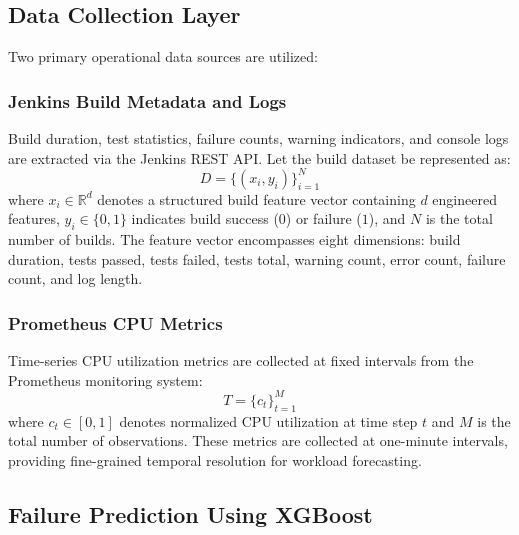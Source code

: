 \documentclass[sn-nature]{sn-jnl}
\theoremstyle{thmstyleone}
\theoremstyle{thmstyletwo}
\theoremstyle{thmstylethree}
\begin{document}
\subsection{Data Collection Layer}\label{subsec:datacollection}

Two primary operational data sources are utilized:

\subsubsection{Jenkins Build Metadata and Logs}
Build duration, test statistics, failure counts, warning indicators, and console logs are extracted via the Jenkins REST API.
Let the build dataset be represented as:
\begin{equation}
D = \{(x_i, y_i)\}_{i=1}^{N}
\end{equation}
where $x_i \in \mathbb{R}^d$ denotes a structured build feature vector containing $d$ engineered features, $y_i \in \{0,1\}$ indicates build success ($0$) or failure ($1$), and $N$ is the total number of builds.
The feature vector encompasses eight dimensions: build duration, tests passed, tests failed, tests total, warning count, error count, failure count, and log length.

\subsubsection{Prometheus CPU Metrics}
Time-series CPU utilization metrics are collected at fixed intervals from the Prometheus monitoring system:
\begin{equation}
T = \{c_t\}_{t=1}^{M}
\end{equation}
where $c_t \in [0, 1]$ denotes normalized CPU utilization at time step $t$ and $M$ is the total number of observations.
These metrics are collected at one-minute intervals, providing fine-grained temporal resolution for workload forecasting.

\subsection{Failure Prediction Using XGBoost}\label{subsec:failurepred}
\end{document}

